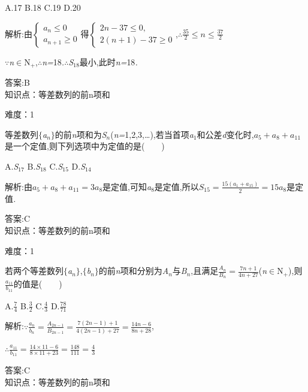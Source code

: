 \documentclass{article} %
\begin{document}
 A.17 B.18 C.19 D.20

 解析:由$\left\{
\begin{array}{l}
a_n\le 0 \\
a_{n+1}\ge 0
\end{array}
\right.$得$\left\{
\begin{array}{l}
2n-37 \le 0, \\
2(n+1)-37\ge 0
\end{array}
\right.$,$\therefore \frac{35}{2}\le n\le \frac{37}{2}$

\textit{$\because$n}$\mathrm{\in}$N\textit{${}_{+}$},\textit{$\therefore$n=}18\textit{.$\therefore$S}${}_{18}$最小,此时\textit{n=}18\textit{.}

 答案:B \\

知识点：等差数列的前n项和

难度：1

 等差数列$\mathrm{\{}$\textit{a${}_{n}$}$\mathrm{\}}$的前\textit{n}项和为\textit{S${}_{n}$}(\textit{n=}1,2,3,{\dots}),若当首项\textit{a}${}_{1}$和公差\textit{d}变化时,$a_5+a_8+a_{11}$是一个定值,则下列选项中为定值的是(\textit{　　})

 A.\textit{S}${}_{17}$ B.\textit{S}${}_{18}$ C.\textit{S}${}_{15}$ D.\textit{S}${}_{14}$

 解析:由$a_5+a_8+a_{11}=3a_8$是定值,可知\textit{a}${}_{8}$是定值,所以$S_{15}=\frac{15(a_1+a_{15})}{2}=15a_8$是定值\textit{.}

 答案:C \\

知识点：等差数列的前n项和

难度：1

 若两个等差数列$\mathrm{\{}$\textit{a${}_{n}$}$\mathrm{\}}$,$\mathrm{\{}$\textit{b${}_{n}$}$\mathrm{\}}$的前\textit{n}项和分别为\textit{A${}_{n}$}与\textit{B${}_{n}$},且满足$\frac{A_n}{B_n}=\frac{7n+1}{4n+27}$(\textit{n}$\mathrm{\in}$N\textit{${}_{+}$}),则$\frac{a_{11}}{b_{11}}$的值是(\textit{　　})

 A.$\frac{7}{4}$ B.$\frac{3}{2}$ C.$\frac{4}{3}$ D.$\frac{78}{71}$

 解析:$\because \frac{a_n}{b_n}=\frac{A_{2n-1}}{B_{2n-1}}=\frac{7(2n-1)+1}{4(2n-1)+27}=\frac{14n-6}{8n+28}$,

$\therefore \frac{a_{11}}{b_{11}}=\frac{14\times 11-6}{8\times 11+23}=\frac{148}{111}=\frac{4}{3}$

 答案:C \\

知识点：等差数列的前n项和
\end{document}
